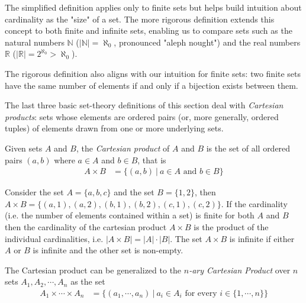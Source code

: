 
\noindent The simplified definition applies only to finite sets but helps build intuition about cardinality as the "size" of a set. The more rigorous definition extends this concept to both finite and infinite sets, enabling us to compare sets such as the natural numbers $\mathbb{N}$ ($|\mathbb{N}| = \aleph_0$, pronounced "aleph nought") and the real numbers $\mathbb{R}$ ($|\mathbb{R}| = 2^{\aleph_0} > \aleph_0$). \\ \steezybreak

\noindent The rigorous definition also aligns with our intuition for finite sets: two finite sets have the same number of elements if and only if a bijection exists between them.
\newpage

\noindent The last three basic set-theory definitions of this section deal with \textit{Cartesian products}: sets whose elements are ordered pairs (or, more generally, ordered tuples) of elements drawn from one or more underlying sets.

\begin{definition}
    Given sets $A$ and $B$, the \textit{Cartesian product} of $A$ and $B$ is the set of all ordered pairs $(a,b)$ where $a\in A$ and $b\in B$, that is 
    \begin{align}
        A\times B &= \{(a,b) \ | \ a\in A \text{ and } b\in B\} \nonumber
    \end{align} 
\end{definition}
Consider the set $A=\{a,b,c\}$ and the set $B=\{1,2\}$, then $A\times B =\{(a,1), (a,2), (b,1), (b,2), (c,1), (c,2)\}$. If the cardinality (i.e. the number of elements contained within a set) is finite for both $A$ and $B$ then the cardinality of the cartesian product $A\times B$ is the product of the individual cardinalities, i.e. $|A\times B| = |A|\cdot |B|$. The set $A\times B$ is infinite if either $A$ or $B$ is infinite and the other set is non-empty.
\begin{definition}
    The Cartesian product can be generalized to the \textit{$n$-ary Cartesian Product }over $n$ sets $A_1, A_2, \cdots, A_n$ as the set 
    \begin{align}
        A_1 \times \cdots \times A_n &= \{(a_1, \cdots, a_n ) \ | \ a_i \in A_i \text{ for every }i\in \{1, \cdots, n\}\} \nonumber
    \end{align}
\end{definition}

